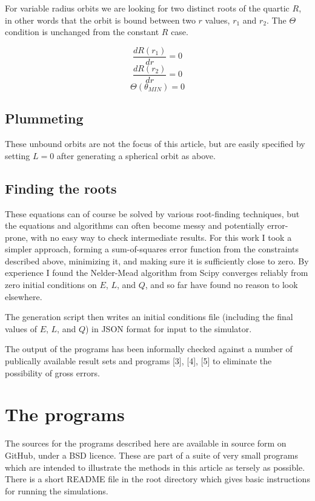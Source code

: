 \documentclass[11pt]{article}
\begin{document}
For variable radius orbits we are looking for two distinct roots of the quartic $R$, in other words that the orbit is bound between two $r$ values, $r_1$ and $r_2$.  The $\Theta$ condition is unchanged from the constant $R$ case.

$$
\frac{d R(r_1)}{d r} = 0
$$
$$
\frac{d R(r_2)}{d r} = 0
$$
$$
\Theta(\theta_{MIN}) = 0
$$

\subsection{Plummeting}

These unbound orbits are not the focus of this article, but are easily specified by setting $L = 0$ after generating a spherical orbit as above.

\subsection{Finding the roots}

These equations can of course be solved by various root-finding techniques, but the equations and algorithms can often become messy and potentially error-prone, with no easy way to check intermediate results.  For this work I took a simpler approach, forming a sum-of-squares error function from the constraints described above, minimizing it, and making sure it is sufficiently close to zero.  By experience I found the Nelder-Mead algorithm from Scipy converges reliably from zero initial conditions on $E$, $L$, and $Q$, and so far have found no reason to look elsewhere.

The generation script then writes an initial conditions file (including the final values of $E$, $L$, and $Q$) in JSON format for input to the simulator.

The output of the programs has been informally checked against a number of publically available result sets and programs [3], [4], [5] to eliminate the possibility of gross errors.

\section{The programs}

The sources for the programs described here are available in source form on GitHub, under a BSD licence.  These are part of a suite of very small programs which are intended to illustrate the methods in this article as tersely as possible.  There is a short README file in the root directory which gives basic instructions for running the simulations.
\end{document}
